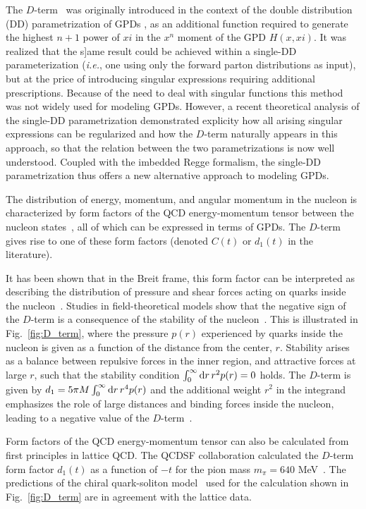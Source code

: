 The $D$-term~\cite{Polyakov:1999gs} was originally introduced in
the context of the double distribution (DD) parametrization of GPDs
\cite{Radyushkin:1998es}, as an additional function required to generate the 
highest $n+1$ power of $xi$ in the $x^n$ moment of the GPD $H(x, xi)$. It was
realized \cite{Belitsky:2000vk} that the s]ame result could be achieved within
a single-DD parameterization (\textit{i.e.}, one using only the forward parton
distributions as input), but at the price of introducing singular expressions
requiring additional prescriptions. Because of the need to deal with singular
functions this method was not widely used for modeling GPDs. However, a
recent theoretical analysis of the single-DD parametrization
\cite{Radyushkin:2011dh} demonstrated explicity how all arising singular
expressions can be regularized and how the $D$-term naturally appears in
this approach, so that the relation between the two parametrizations is now
well understood. Coupled with the imbedded Regge formalism, the single-DD 
parametrization thus offers a new alternative approach to modeling GPDs.

The distribution of energy, momentum, and angular momentum in the nucleon
is characterized by form factors of the QCD energy-momentum tensor between
the nucleon states~\cite{Ji:1996ek,Jaffe:1989jz}, all of which can be
expressed in terms of GPDs. The $D$-term gives rise to one of these form
factors (denoted $C(t)$ or $d_1(t)$ in the literature).

It has been shown that in the Breit frame, this form factor can
be interpreted as describing the distribution of pressure and shear forces
acting on quarks inside the nucleon~\cite{Polyakov:2002yz}. Studies in
field-theoretical models show that the negative sign of the $D$-term is a
consequence of the stability of the nucleon~\cite{Goeke:2007fp}. This is
illustrated in Fig.~\ref{fig:D_term}, where the pressure $p(r)$ experienced
by quarks inside the nucleon is given as a function of the distance from the
center, $r$. Stability arises as a balance between repulsive forces in the
inner region, and attractive forces at large $r$, such that the stability
condition $\int_0^\infty {\rm d}r\,r^2p(r)=0$ holds.
The $D$-term is given by $d_1=5\pi M \int_0^\infty{\rm d}r\,r^4p(r)$ and the
additional weight $r^2$ in the integrand emphasizes the role of large
distances and binding forces inside the nucleon, leading to a negative
value of the $D$-term~\cite{Goeke:2007fp}.

Form factors of the QCD energy-momentum tensor can also be calculated from
first principles in lattice QCD. The QCDSF collaboration calculated the
$D$-term form factor $d_1(t)$ as a function of $-t$ for the pion
mass $m_{\pi}=640$ MeV~\cite{Gockeler:2003jfa}. The predictions of the chiral
quark-soliton model~\cite{Goeke:2007fp} used for the calculation shown in
Fig.~\ref{fig:D_term} are in agreement with the lattice data.

